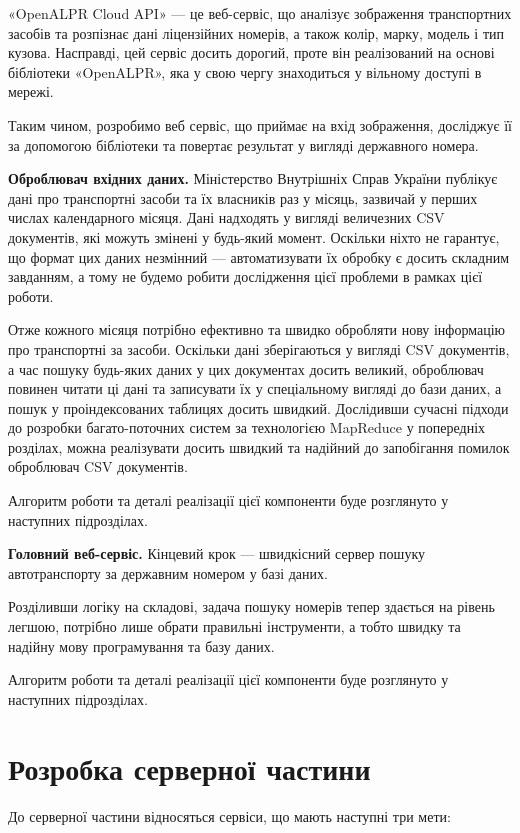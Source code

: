 «OpenALPR Cloud API» — це веб-сервіс, що аналізує зображення транспортних засобів та розпізнає
дані ліцензійних номерів, а також колір, марку, модель і тип кузова.
Насправді, цей сервіс досить дорогий, проте він реалізований на основі
бібліотеки «OpenALPR», яка у свою чергу знаходиться у вільному доступі в мережі.

Таким чином, розробимо веб сервіс, що приймає на вхід зображення,
досліджує її за допомогою бібліотеки та повертає результат у вигляді державного номера.

\textbf{Оброблювач вхідних даних.}
Міністерство Внутрішніх Справ України публікує дані про транспортні засоби та їх власників раз у
місяць, зазвичай у перших числах календарного місяця.
Дані надходять у вигляді величезних CSV документів, які можуть змінені у будь-який момент.
Оскільки ніхто не гарантує, що формат
цих даних незмінний — автоматизувати їх обробку є досить складним завданням, а тому не будемо
робити дослідження цієї проблеми в рамках цієї роботи.

Отже кожного місяця потрібно ефективно та швидко обробляти нову інформацію
про транспортні за засоби.
Оскільки дані зберігаються у вигляді CSV документів, а час пошуку будь-яких даних у цих документах
досить великий, оброблювач повинен читати ці дані та записувати їх у спеціальному
вигляді до бази даних, а пошук у проіндексованих таблицях досить швидкий.
Дослідивши сучасні підходи до розробки багато-поточних
систем за технологією MapReduce у попередніх розділах, можна реалізувати досить швидкий та
надійний до запобігання помилок оброблювач CSV документів.

Алгоритм роботи та деталі реалізації цієї компоненти буде розглянуто у наступних підрозділах.

\textbf{Головний веб-сервіс.}
Кінцевий крок — швидкісний сервер пошуку автотранспорту за
державним номером у базі даних.

Розділивши логіку на складові, задача пошуку номерів тепер здається на рівень легшою,
потрібно лише обрати правильні інструменти,
а тобто швидку та надійну мову програмування та базу даних.

Алгоритм роботи та деталі реалізації цієї компоненти буде розглянуто у наступних підрозділах.

\section{Розробка серверної частини}

До серверної частини відносяться сервіси, що мають наступні три мети:


